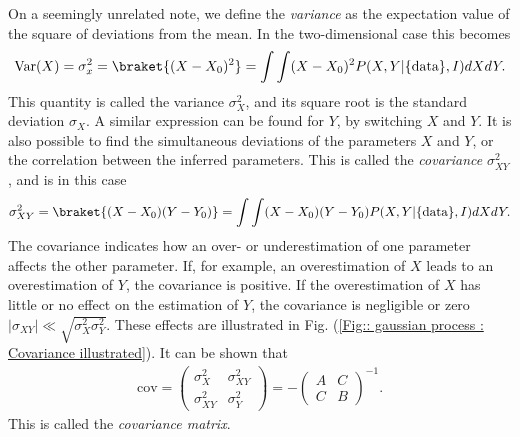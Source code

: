 \documentclass[twoside,english]{uiofysmaster}
\begin{document}
On a seemingly unrelated note, we define the \textit{variance} as the expectation value of the square of deviations from the mean. In the two-dimensional case this becomes \cite{sivia2006data}
\begin{align}
\text{Var}(X) = \sigma_x^2 = \braket{(X - X_0)^2} = \int \int (X - X_0)^2 P (X, Y | \{\text{data}\}, I) dXdY.
\end{align}
This quantity is called the variance $\sigma_X^2$, and its square root is the standard deviation $\sigma_X$. A similar expression can be found for $Y$, by switching $X$ and $Y$. It is also possible to find the simultaneous deviations of the parameters $X$ and $Y$, or the correlation between the inferred parameters. This is called the \textit{covariance} $\sigma_{XY}^2$, and is in this case
\begin{align}
\sigma_{XY}^2 = \braket{(X - X_0) (Y - Y_0)} =\int \int (X - X_0) (Y - Y_0) P (X, Y | \{\text{data}\}, I) dXdY.
\end{align}
The covariance indicates how an over- or underestimation of one parameter affects the other parameter. If, for example, an overestimation of $X$ leads to an overestimation of $Y$, the covariance is positive. If the overestimation of $X$ has little or no effect on the estimation of $Y$, the covariance is negligible or zero $|\sigma_{XY}| \ll \sqrt{\sigma_X^2 \sigma_Y^2}$. These effects are illustrated in Fig. (\ref{Fig:: gaussian process : Covariance illustrated}). It can be shown that \cite{sivia2006data}
\begin{align}
\text{cov} = 
\begin{pmatrix}
\sigma_X^2 & \sigma_{XY}^2\\
\sigma_{XY}^2 & \sigma_Y^2
\end{pmatrix}
= - \begin{pmatrix}
A & C\\
C & B
\end{pmatrix}^{-1}.
\end{align}
This is called the \textit{covariance matrix}.
\end{document}
